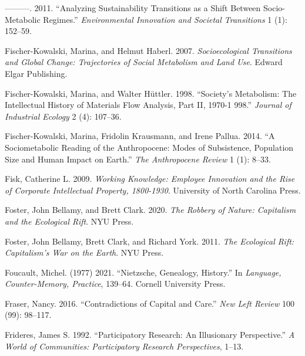 \documentclass[a4paper, nobind]{templates/ociamthesis}
\newlength{\cslhangindent}
\newenvironment{CSLReferences}[2] %
 {%
  \setlength{\parindent}{0pt}
  \ifodd #1
  \let\oldpar\par
  \def\par{\hangindent=\cslhangindent\oldpar}
  \fi
  \setlength{\parskip}{1mm}
  \setlength{\baselineskip}{6mm}
 }%
 {}
\begin{document}
\begin{CSLReferences}{1}{0}
\leavevmode{}%
---------. 2011. {``Analyzing Sustainability Transitions as a Shift Between Socio-Metabolic Regimes.''} \emph{Environmental Innovation and Societal Transitions} 1 (1): 152--59.

\leavevmode{}%
Fischer-Kowalski, Marina, and Helmut Haberl. 2007. \emph{Socioecological {Transitions} and {Global Change}: {Trajectories} of {Social Metabolism} and {Land Use}}. {Edward Elgar Publishing}.

\leavevmode{}%
Fischer-Kowalski, Marina, and Walter Hüttler. 1998. {``Society's {Metabolism}: {The Intellectual History} of {Materials Flow Analysis}, {Part II}, 1970-1 998.''} \emph{Journal of Industrial Ecology} 2 (4): 107--36.

\leavevmode{}%
Fischer-Kowalski, Marina, Fridolin Krausmann, and Irene Pallua. 2014. {``A Sociometabolic Reading of the {Anthropocene}: {Modes} of Subsistence, Population Size and Human Impact on {Earth}.''} \emph{The Anthropocene Review} 1 (1): 8--33.

\leavevmode{}%
Fisk, Catherine L. 2009. \emph{Working {Knowledge}: {Employee Innovation} and the {Rise} of {Corporate Intellectual Property}, 1800-1930}. {University of North Carolina Press}.

\leavevmode{}%
Foster, John Bellamy, and Brett Clark. 2020. \emph{The {Robbery} of {Nature}: {Capitalism} and the {Ecological Rift}}. {NYU Press}.

\leavevmode{}%
Foster, John Bellamy, Brett Clark, and Richard York. 2011. \emph{The {Ecological Rift}: {Capitalism}'s {War} on the {Earth}}. {NYU Press}.

\leavevmode{}%
Foucault, Michel. (1977) 2021. {``Nietzsche, Genealogy, History.''} In \emph{Language, Counter-Memory, Practice}, 139--64. {Cornell University Press}.

\leavevmode{}%
Fraser, Nancy. 2016. {``Contradictions of Capital and Care.''} \emph{New Left Review} 100 (99): 98--117.

\leavevmode{}%
Frideres, James S. 1992. {``Participatory Research: {An} Illusionary Perspective.''} \emph{A World of Communities: Participatory Research Perspectives}, 1--13.


\end{CSLReferences}
\end{document}
